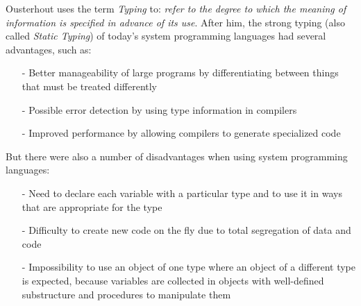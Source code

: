 Ousterhout uses the term \emph{Typing} to: \textit{refer to the degree to which
the meaning of information is specified in advance of its use}. After him, the
strong typing (also called \emph{Static Typing}) of today's system programming
languages had several advantages, such as:

\begin{itemize}
    \item[-] Better manageability of large programs by differentiating between
        things that must be treated differently
    \item[-] Possible error detection by using type information in compilers
    \item[-] Improved performance by allowing compilers to generate specialized code
\end{itemize}

But there were also a number of disadvantages when using system programming
languages:

\begin{itemize}
    \item[-] Need to declare each variable with a particular type and to use it
        in ways that are appropriate for the type
    \item[-] Difficulty to create new code on the fly due to total segregation
        of data and code
    \item[-] Impossibility to use an object of one type where an object of a
        different type is expected, because variables are collected in objects
        with well-defined substructure and procedures to manipulate them
\end{itemize}
